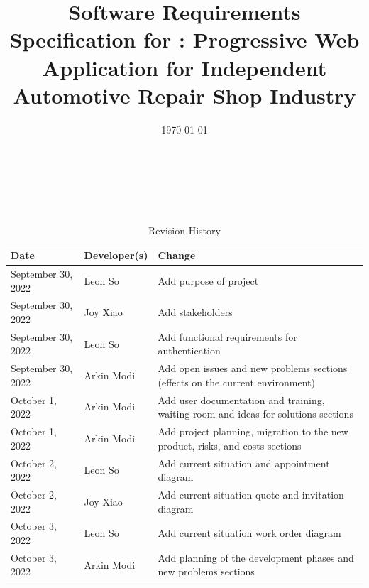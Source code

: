 \documentclass[12pt]{article}
\begin{document}
\title{Software Requirements Specification for \progname: Progressive Web Application for Independent
	Automotive Repair Shop Industry}
\author{\authname}
\date{\today}

\maketitle

~\newpage


\tableofcontents

~\newpage

\begin{table}[hp]
	\caption{Revision History} \label{TblRevisionHistory}
	\begin{tabularx}{\textwidth}{llX}
		\toprule
		\textbf{Date}      & \textbf{Developer(s)} & \textbf{Change}                                                                    \\
		\midrule
		September 30, 2022 & Leon So               & Add purpose of project                                                             \\
		September 30, 2022 & Joy Xiao              & Add stakeholders                                                                   \\
		September 30, 2022 & Leon So               & Add functional requirements for authentication                                     \\
		September 30, 2022 & Arkin Modi            & Add open issues and new problems sections (effects on the current environment)     \\
		October 1, 2022    & Arkin Modi            & Add user documentation and training, waiting room and ideas for solutions sections \\
		October 1, 2022    & Arkin Modi            & Add project planning, migration to the new product, risks, and costs sections      \\
		October 2, 2022    & Leon So               & Add current situation and appointment diagram                                      \\
		October 2, 2022    & Joy Xiao              & Add current situation quote and invitation diagram                                 \\
		October 3, 2022    & Leon So               & Add current situation work order diagram                                           \\
		October 3, 2022    & Arkin Modi            & Add planning of the development phases and new problems sections                   \\

\end{tabularx}
\end{table}
\end{document}
